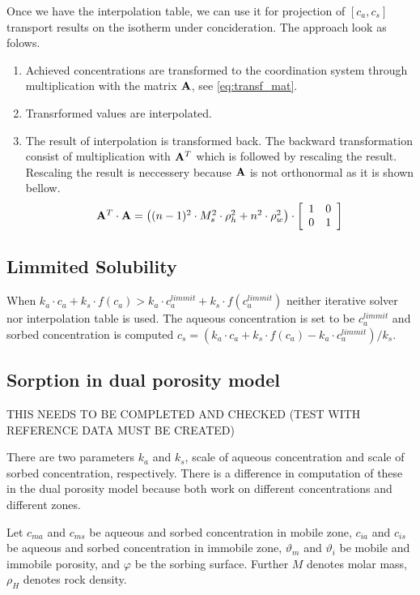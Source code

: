 Once we have the interpolation table, we can use it for projection of ${[c_a,c_s]}$ transport results on the isotherm under concideration. The approach look as folows.
\begin{enumerate}
 \item Achieved concentrations are transformed to the coordination system through multiplication with the matrix ${\bf A}$, see \ref{eq:transf_mat}.
 \item Transrformed values are interpolated.
 \item The result of interpolation is transformed back. The backward transformation consist of multiplication with ${\bf A}^T$ which is followed by rescaling the result. Rescaling the result is neccessery because  ${\bf A}$ is not orthonormal as it is shown bellow.
 \[
 \begin{array}{l}
 {\bf A}^T\cdot{\bf A} =
  \left((n - 1)^2\cdot M_s^2\cdot \rho_h^2 + n^2\cdot \rho_w^2\right)\cdot\left[\begin{array}{cc}
    1 & 0\\
    0 & 1
  \end{array}\right]
  \end{array}
 \]
\end{enumerate}


\subsection{Limmited Solubility}\label{subsec:lim_solub}
When $k_a\cdot c_a + k_s\cdot f(c_a) > k_a\cdot c_a^{limmit} + k_s\cdot f(c_a^{limmit})$ neither iterative solver nor interpolation table is used. The aqueous concentration is set to be $c_a^{limmit}$ and sorbed concentration is computed $c_s = (k_a\cdot c_a + k_s\cdot f(c_a) - k_a\cdot c_a^{limmit})/k_s$.

\subsection{Sorption in dual porosity model} \label{subsec:sorp_dual_por}
THIS NEEDS TO BE COMPLETED AND CHECKED (TEST WITH REFERENCE DATA MUST BE CREATED)
\vspace{1cm}

There are two parameters $k_a$ and $k_s$, scale of aqueous concentration and scale of sorbed concentration, respectively.  
There is a difference in computation of these in the dual porosity model because both work on different concentrations
and different zones.

Let $c_{ma}$ and $c_{ms}$ be aqueous and sorbed concentration in mobile zone, 
$c_{ia}$ and $c_{is}$ be aqueous and sorbed concentration in immobile zone,
$\vartheta_m$ and $\vartheta_i$ be mobile and immobile porosity,
and $\varphi$ be the sorbing surface.
Further $M$ denotes molar mass, $\rho_H$ denotes rock density.

